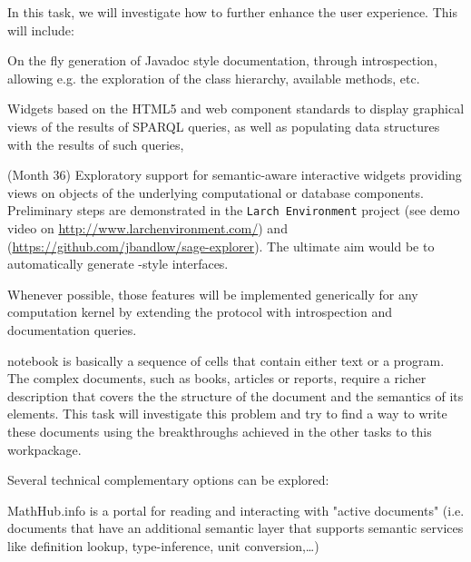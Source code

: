 \begin{workpackage}
\begin{tasklist}
\begin{task}[id=dynamic-inspect,title=Dynamic documentation and exploration system,lead=PS, partners={SR,USO}]
  In this task, we will investigate how to further enhance the user
  experience. This will include:
  \begin{compactitem}
  \item On the fly generation of Javadoc style documentation, through
    introspection, allowing e.g. the exploration of the class
    hierarchy, available methods, etc.
  \item Widgets based on the HTML5 and web component standards to display
    graphical views of the results of SPARQL queries, as well as populating data
    structures with the results of such queries,
  \item {} (Month 36)
    Exploratory support for semantic-aware interactive widgets
    providing views on objects of the underlying computational or
    database components. Preliminary steps are demonstrated in the
    \texttt{Larch Environment} project (see demo video on
    \url{http://www.larchenvironment.com/}) and
    (\url{https://github.com/jbandlow/sage-explorer}). The ultimate
    aim would be to automatically generate \LMFDB-style interfaces.
  \end{compactitem}
  Whenever possible, those features will be implemented generically
  for any computation kernel by extending the \Jupyter protocol with
  introspection and documentation queries.
\end{task}

\begin{task}[title=Structured documents,id=structdocs,lead=JU,PM=24,lead=JU,partners={SR,USH}]

  \Jupyter notebook is basically a sequence of cells that contain either text or
  a program. The complex documents, such as books, articles or reports, require
  a richer description that covers the the structure of the document and the
  semantics of its elements. This task will investigate this problem and try to
  find a way to write these documents using the breakthroughs achieved in the
  other tasks to this workpackage.

  Several technical complementary options can be explored:
  \begin{compactitem}

  \item  MathHub.info is a portal for reading and interacting with
    "active documents" (i.e. documents that have an additional semantic
    layer that supports semantic services like definition lookup,
    type-inference, unit conversion,\ldots)


\end{compactitem}
\end{task}
\end{tasklist}
\end{workpackage}
